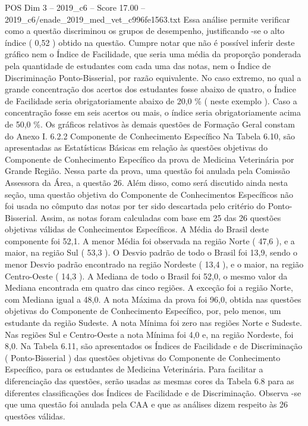 \begin{textsample}{POS Dim 3 – 2019\_c6 – Score 17.00 – 2019\_c6/enade\_2019\_med\_vet\_c996fe1563.txt}
Essa análise permite verificar como a questão discriminou os grupos de desempenho, justificando -se o alto índice ( 0,52 ) obtido na questão.
Cumpre notar que não é possível inferir deste gráfico nem o Índice de Facilidade, que seria uma média da proporção ponderada pela quantidade de estudantes com cada uma das notas, nem o Índice de Discriminação Ponto-Bisserial, por razão equivalente.
No caso extremo, no qual a grande concentração dos acertos dos estudantes fosse abaixo de quatro, o Índice de Facilidade seria obrigatoriamente abaixo de 20,0 \% ( neste exemplo ).
Caso a concentração fosse em seis acertos ou mais, o índice seria obrigatoriamente acima de 50,0 \%.
Os gráficos relativos às demais questões de Formação Geral constam do Anexo I. 6.2.2 Componente de Conhecimento Específico Na Tabela 6.10, são apresentadas as Estatísticas Básicas em relação às questões objetivas do Componente de Conhecimento Específico da prova de Medicina Veterinária por Grande Região.
Nessa parte da prova, uma questão foi anulada pela Comissão Assessora da Área, a questão 26.
Além disso, como será discutido ainda nesta seção, uma questão objetiva do Componente de Conhecimentos Específicos não foi usada no cômputo das notas por ter sido descartada pelo critério do Ponto-Bisserial.
Assim, as notas foram calculadas com base em 25 das 26 questões objetivas válidas de Conhecimentos Específicos.
A Média do Brasil deste componente foi 52,1.
A menor Média foi observada na região Norte ( 47,6 ), e a maior, na região Sul ( 53,3 ).
O Desvio padrão de todo o Brasil foi 13,9, sendo o menor Desvio padrão encontrado na região Nordeste ( 13,4 ), e o maior, na região Centro-Oeste ( 14,3 ).
A Mediana de todo o Brasil foi 52,0, o mesmo valor da Mediana encontrada em quatro das cinco regiões.
A exceção foi a região Norte, com Mediana igual a 48,0.
A nota Máxima da prova foi 96,0, obtida nas questões objetivas do Componente de Conhecimento Específico, por, pelo menos, um estudante da região Sudeste.
A nota Mínima foi zero nas regiões Norte e Sudeste.
Nas regiões Sul e Centro-Oeste a nota Mínima foi 4,0 e, na região Nordeste, foi 8,0.
Na Tabela 6.11, são apresentados os Índices de Facilidade e de Discriminação ( Ponto-Bisserial ) das questões objetivas do Componente de Conhecimento Específico, para os estudantes de Medicina Veterinária.
Para facilitar a diferenciação das questões, serão usadas as mesmas cores da Tabela 6.8 para as diferentes classificações dos Índices de Facilidade e de Discriminação.
Observa -se que uma questão foi anulada pela CAA e que as análises dizem respeito às 26 questões válidas.

\end{textsample}
